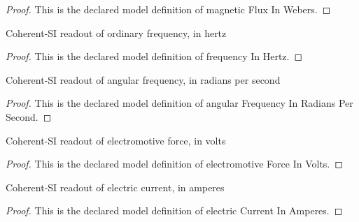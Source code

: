 \begin{proof}
  This is the declared model definition of magnetic Flux In Webers.
\end{proof}
\begin{definition}
  \label{def:physics:phyx-mini-0932:phyxminiproblems-problemphyxmini0932-frequencyinhertz}
  Coherent-SI readout of ordinary frequency, in hertz
\end{definition}
\begin{proof}
  This is the declared model definition of frequency In Hertz.
\end{proof}
\begin{definition}
  \label{def:physics:phyx-mini-0932:phyxminiproblems-problemphyxmini0932-angularfrequencyinradianspersecond}
  Coherent-SI readout of angular frequency, in radians per second
\end{definition}
\begin{proof}
  This is the declared model definition of angular Frequency In Radians Per Second.
\end{proof}
\begin{definition}
  \label{def:physics:phyx-mini-0932:phyxminiproblems-problemphyxmini0932-electromotiveforceinvolts}
  Coherent-SI readout of electromotive force, in volts
\end{definition}
\begin{proof}
  This is the declared model definition of electromotive Force In Volts.
\end{proof}
\begin{definition}
  \label{def:physics:phyx-mini-0932:phyxminiproblems-problemphyxmini0932-electriccurrentinamperes}
  Coherent-SI readout of electric current, in amperes
\end{definition}
\begin{proof}
  This is the declared model definition of electric Current In Amperes.
\end{proof}
